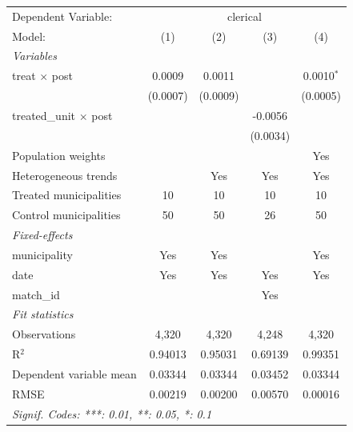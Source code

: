 
\begingroup
\centering
\begin{tabular}{lcccc}
   \tabularnewline \midrule \midrule
   Dependent Variable: & \multicolumn{4}{c}{clerical}\\
   Model:                        & (1)      & (2)      & (3)      & (4)\\  
   \midrule
   \emph{Variables}\\
   treat $\times$ post           & 0.0009   & 0.0011   &          & 0.0010$^{*}$\\   
                                 & (0.0007) & (0.0009) &          & (0.0005)\\   
   treated\_unit $\times$ post   &          &          & -0.0056  &   \\   
                                 &          &          & (0.0034) &   \\   
   Population weights            &          &          &          & Yes\\  
   Heterogeneous trends          &          & Yes      & Yes      & Yes\\  
   Treated municipalities        & 10       & 10       & 10       & 10\\  
   Control municipalities        & 50       & 50       & 26       & 50\\  
   \midrule
   \emph{Fixed-effects}\\
   municipality                  & Yes      & Yes      &          & Yes\\  
   date                          & Yes      & Yes      & Yes      & Yes\\  
   match\_id                     &          &          & Yes      & \\  
   \midrule
   \emph{Fit statistics}\\
   Observations                  & 4,320    & 4,320    & 4,248    & 4,320\\  
   R$^2$                         & 0.94013  & 0.95031  & 0.69139  & 0.99351\\  
   Dependent variable mean       & 0.03344  & 0.03344  & 0.03452  & 0.03344\\  
   RMSE                          & 0.00219  & 0.00200  & 0.00570  & 0.00016\\  
   \midrule \midrule
   \multicolumn{5}{l}{\emph{Signif. Codes: ***: 0.01, **: 0.05, *: 0.1}}\\
\end{tabular}
\par\endgroup


